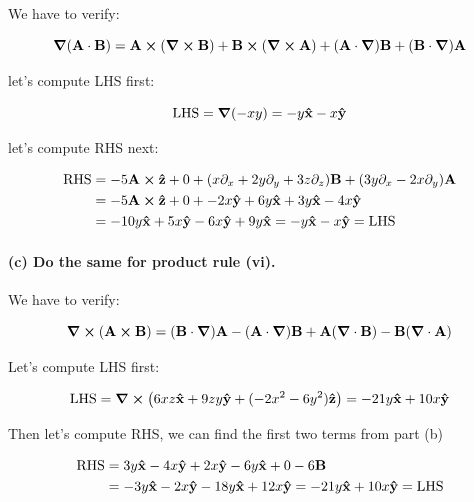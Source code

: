 \documentclass{article}
\numberwithin{equation}{section}
\newcommand{\vbh}[1]{\vb{\hat{#1}}}
\begin{document}
We have to verify:

\begin{equation}
    \vb{\grad (A \cdot B) = A \cross (\curl B) + B \cross (\curl A) + (A \cdot \grad) B + (B \cdot \grad) A}
\end{equation}

let's compute LHS first:

\begin{equation}
    \text{LHS} = \grad (-xy) = - y \vbh{x} - x \vbh{y}
\end{equation}

let's compute RHS next:

\begin{equation}
    \begin{split}
        \text{RHS} &= -5 \vb{A \cross \hat{z}} + 0 + (x \partial_x + 2y \partial_y + 3z \partial_z) \vb{B} + (3y \partial_x - 2x \partial_y) \vb{A} \\
        &= -5 \vb{A} \cross \vbh{z} + 0 + -2 x \vbh{y} + 6y\vbh{x} + 3y\vbh{x} - 4x \vbh{y} \\
        &= -10 y \vbh{x} + 5x \vbh{y} - 6x \vbh{y} + 9 y \vbh{x} = - y \vbh{x} - x \vbh{y} = \text{LHS}
    \end{split}
\end{equation}

\paragraph{(c) Do the same for product rule (vi).\\}

We have to verify:

\begin{equation}
    \vb{ \curl ( A \cross B) = (B \cdot \grad) A - (A \cdot \grad) B + A (\grad \cdot B) - B (\grad \cdot A)}
\end{equation}

Let's compute LHS first:

\begin{equation}
    \text{LHS} = \curl (6xz \vbh{x} + 9zy \vbh{y} + (-2x^2 - 6y^2) \vbh{z}) = -21 y\vbh{x} + 10 x \vbh{y}
\end{equation}

Then let's compute RHS, we can find the first two terms from part (b)

\begin{equation}
\begin{split}
    \text{RHS} &= 3y \vbh{x} - 4x \vbh{y} + 2x\vbh{y} - 6y \vbh{x} + 0 - 6\vb{B} \\
    &= -3y \vbh{x} - 2x \vbh{y} - 18 y\vbh{x} + 12 x \vbh{y} = -21 y\vbh{x} + 10 x \vbh{y} = \text{LHS}
    \end{split}
\end{equation}
\end{document}
